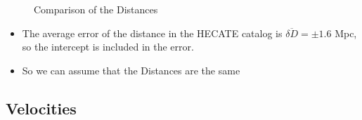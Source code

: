 \documentclass[
]{article}
\providecommand{\tightlist}{%
  \setlength{\itemsep}{0pt}\setlength{\parskip}{0pt}}\usepackage{longtable,booktabs,array}
\begin{document}
\begin{figure}


\caption{\label{fig-coord-compare}Comparison of the Distances}

\end{figure}%

\begin{itemize}
\tightlist
\item
  The average error of the distance in the HECATE catalog is
  \(\overline{\delta D} = \pm 1.6\) Mpc, so the intercept is included in
  the error.
\item
  So we can assume that the Distances are the same
\end{itemize}

\subsection{Velocities}\label{velocities}
\end{document}
